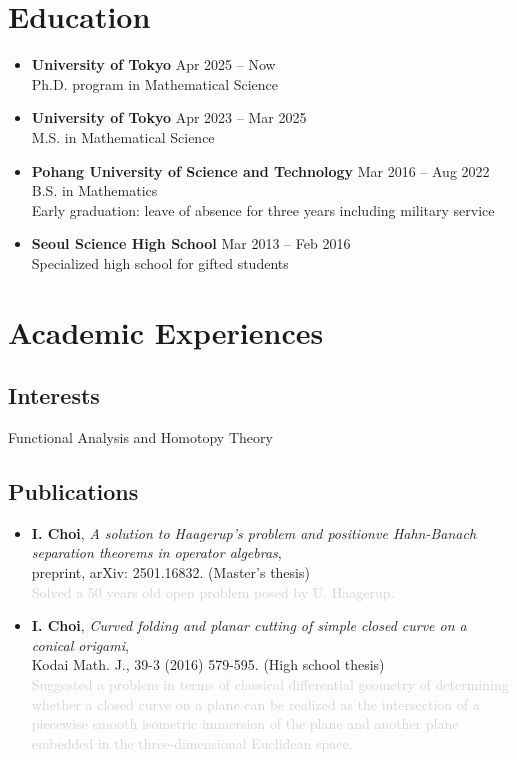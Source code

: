 \documentclass[11pt,a4paper]{article}
\begin{document}
\section*{Education}
\begin{itemize}
\item
	\textbf{University of Tokyo}
	\hfill{\small Apr 2025 -- Now}\\
	Ph.D. program in Mathematical Science
\item
	\textbf{University of Tokyo}
	\hfill{\small Apr 2023 -- Mar 2025}\\
	M.S. in Mathematical Science
\item
	\textbf{Pohang University of Science and Technology}
	\hfill{\small Mar 2016 -- Aug 2022}\\
	B.S. in Mathematics\\
	Early graduation: leave of absence for three years including military service
\item
	\textbf{Seoul Science High School}
	\hfill{\small Mar 2013 -- Feb 2016}\\
	Specialized high school for gifted students
\end{itemize}








\newpage

\section*{Academic Experiences}


\subsection*{Interests}
\hspace{2em}
Functional Analysis and Homotopy Theory

\subsection*{Publications}
\begin{itemize}
\item
	\textbf{I. Choi},
	\emph{A solution to Haagerup's problem and positionve Hahn-Banach separation theorems in operator algebras},\\
	preprint, arXiv: 2501.16832. (Master's thesis)\\
	\textcolor{lightgray}{Solved a 50 years old open problem posed by U. Haagerup.}
\item
	\textbf{I. Choi},
	\emph{Curved folding and planar cutting of simple closed curve on a conical origami},\\
	Kodai Math. J., 39-3 (2016) 579-595. (High school thesis)\\
	\textcolor{lightgray}{Suggested a problem in terms of classical differential geometry of determining whether a closed curve on a plane can be realized as the intersection of a piecewise smooth isometric immersion of the plane and another plane embedded in the three-dimensional Euclidean space.}
\end{itemize}
\end{document}
